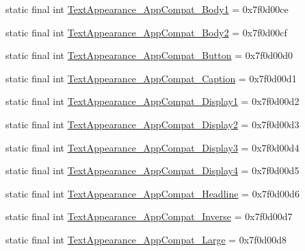 \begin{DoxyCompactItemize}
\item 
static final int \mbox{\hyperlink{classcom_1_1google_1_1android_1_1gms_1_1R_1_1style_ae0068b48da66a1fccee9b98ae8542999}{Text\+Appearance\+\_\+\+App\+Compat\+\_\+\+Body1}} = 0x7f0d00ce
\item 
static final int \mbox{\hyperlink{classcom_1_1google_1_1android_1_1gms_1_1R_1_1style_a1fe56386d606702107a69f2e12cab63b}{Text\+Appearance\+\_\+\+App\+Compat\+\_\+\+Body2}} = 0x7f0d00cf
\item 
static final int \mbox{\hyperlink{classcom_1_1google_1_1android_1_1gms_1_1R_1_1style_ac3c20f90741b0ef4e58fc426a627b89a}{Text\+Appearance\+\_\+\+App\+Compat\+\_\+\+Button}} = 0x7f0d00d0
\item 
static final int \mbox{\hyperlink{classcom_1_1google_1_1android_1_1gms_1_1R_1_1style_a2a9a14f83cd4d6e3f275b5080c55c59a}{Text\+Appearance\+\_\+\+App\+Compat\+\_\+\+Caption}} = 0x7f0d00d1
\item 
static final int \mbox{\hyperlink{classcom_1_1google_1_1android_1_1gms_1_1R_1_1style_a1c9004d455c4d8b90e8f51db7bc49d7f}{Text\+Appearance\+\_\+\+App\+Compat\+\_\+\+Display1}} = 0x7f0d00d2
\item 
static final int \mbox{\hyperlink{classcom_1_1google_1_1android_1_1gms_1_1R_1_1style_a1b06f22d87b4b1a499a7c866cd8c3c4f}{Text\+Appearance\+\_\+\+App\+Compat\+\_\+\+Display2}} = 0x7f0d00d3
\item 
static final int \mbox{\hyperlink{classcom_1_1google_1_1android_1_1gms_1_1R_1_1style_a86b21c83d801f60fa4924342ece4409a}{Text\+Appearance\+\_\+\+App\+Compat\+\_\+\+Display3}} = 0x7f0d00d4
\item 
static final int \mbox{\hyperlink{classcom_1_1google_1_1android_1_1gms_1_1R_1_1style_a1685340c3faa53f1bf733c8431aa1974}{Text\+Appearance\+\_\+\+App\+Compat\+\_\+\+Display4}} = 0x7f0d00d5
\item 
static final int \mbox{\hyperlink{classcom_1_1google_1_1android_1_1gms_1_1R_1_1style_a292b6179d4cf9a9ba9e37ec62ab625ba}{Text\+Appearance\+\_\+\+App\+Compat\+\_\+\+Headline}} = 0x7f0d00d6
\item 
static final int \mbox{\hyperlink{classcom_1_1google_1_1android_1_1gms_1_1R_1_1style_acf30a70676983ed9eb48433636cde9e6}{Text\+Appearance\+\_\+\+App\+Compat\+\_\+\+Inverse}} = 0x7f0d00d7
\item 
static final int \mbox{\hyperlink{classcom_1_1google_1_1android_1_1gms_1_1R_1_1style_aab1cba0615cf58183bc1538bfd86e9b4}{Text\+Appearance\+\_\+\+App\+Compat\+\_\+\+Large}} = 0x7f0d00d8
\item 

\end{DoxyCompactItemize}
